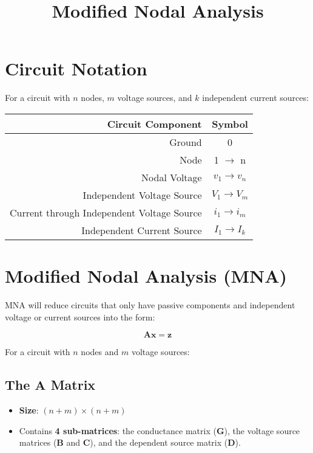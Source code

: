 \documentclass{article}
\begin{document}
\title{Modified Nodal Analysis}
\maketitle

\section{Circuit Notation}

For a circuit with \( n \) nodes, \( m \) voltage sources, and \( k \) independent current sources:

\begin{table}[h!]
\centering
\begin{tabular}{|r|c|}
\hline
\textbf{Circuit Component} & \textbf{Symbol} \\
\hline
Ground & 0 \\
Node & 1 $\to$ n \\
Nodal Voltage & \( v_1 \to v_n \) \\
Independent Voltage Source & \( V_1 \to V_m \) \\
Current through Independent Voltage Source & \( i_1 \to i_m \) \\
Independent Current Source & \( I_1 \to I_k \) \\
\hline
\end{tabular}
\end{table}

\section{Modified Nodal Analysis (MNA)}

MNA will reduce circuits that only have passive components and independent voltage or current sources into the form:

\[
\mathbf{Ax} = \mathbf{z}
\]

For a circuit with \( n \) nodes and \( m \) voltage sources:

\subsection{The $\mathbf{A}$ Matrix}
\begin{itemize}
    \item \textbf{Size}: \( (n + m) \times (n + m) \)
    \item Contains \textbf{4 sub-matrices}: the conductance matrix (\(\mathbf{G}\)), the voltage source matrices (\(\mathbf{B}\) and \(\mathbf{C}\)), and the dependent source matrix (\(\mathbf{D}\)).
\end{itemize}
\end{document}
